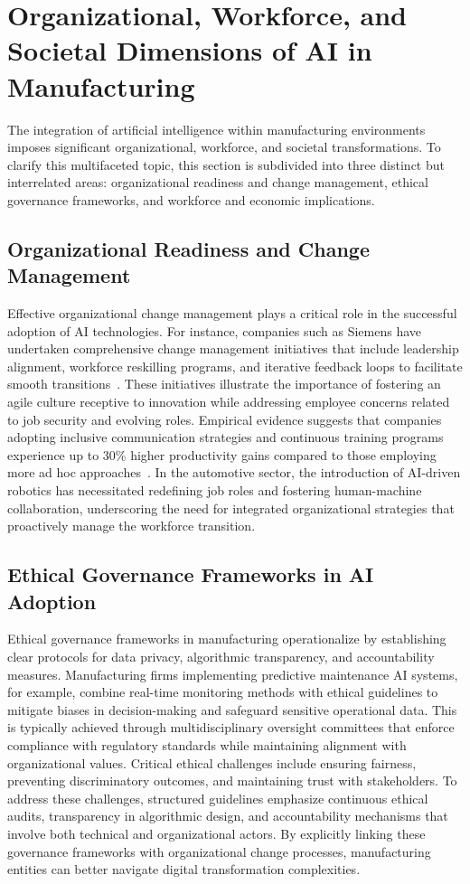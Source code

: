 \documentclass[sigconf]{acmart}
\begin{document}
\section{Organizational, Workforce, and Societal Dimensions of AI in Manufacturing}

The integration of artificial intelligence within manufacturing environments imposes significant organizational, workforce, and societal transformations. To clarify this multifaceted topic, this section is subdivided into three distinct but interrelated areas: organizational readiness and change management, ethical governance frameworks, and workforce and economic implications.

\subsection{Organizational Readiness and Change Management}

Effective organizational change management plays a critical role in the successful adoption of AI technologies. For instance, companies such as Siemens have undertaken comprehensive change management initiatives that include leadership alignment, workforce reskilling programs, and iterative feedback loops to facilitate smooth transitions~\cite{}. These initiatives illustrate the importance of fostering an agile culture receptive to innovation while addressing employee concerns related to job security and evolving roles. Empirical evidence suggests that companies adopting inclusive communication strategies and continuous training programs experience up to 30\% higher productivity gains compared to those employing more ad hoc approaches~\cite{}. In the automotive sector, the introduction of AI-driven robotics has necessitated redefining job roles and fostering human-machine collaboration, underscoring the need for integrated organizational strategies that proactively manage the workforce transition.

\subsection{Ethical Governance Frameworks in AI Adoption}

Ethical governance frameworks in manufacturing operationalize by establishing clear protocols for data privacy, algorithmic transparency, and accountability measures. Manufacturing firms implementing predictive maintenance AI systems, for example, combine real-time monitoring methods with ethical guidelines to mitigate biases in decision-making and safeguard sensitive operational data. This is typically achieved through multidisciplinary oversight committees that enforce compliance with regulatory standards while maintaining alignment with organizational values. Critical ethical challenges include ensuring fairness, preventing discriminatory outcomes, and maintaining trust with stakeholders. To address these challenges, structured guidelines emphasize continuous ethical audits, transparency in algorithmic design, and accountability mechanisms that involve both technical and organizational actors. By explicitly linking these governance frameworks with organizational change processes, manufacturing entities can better navigate digital transformation complexities.
\end{document}

